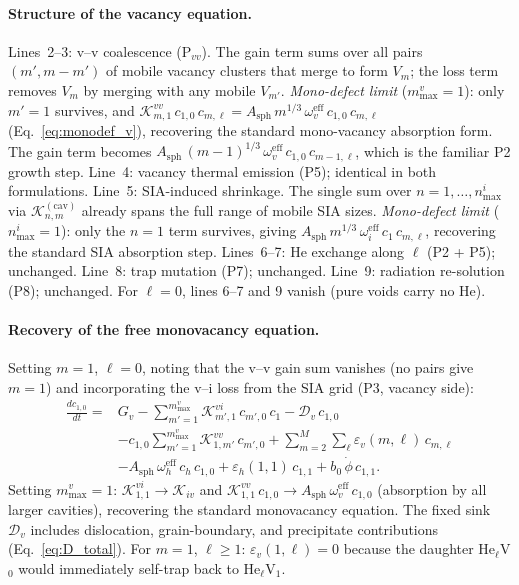\paragraph{Structure of the vacancy equation.}
Lines~2--3: v--v coalescence (P$_{vv}$). The gain term sums over all
pairs $(m', m{-}m')$ of mobile vacancy clusters that merge to form
$V_m$; the loss term removes $V_m$ by merging with any mobile $V_{m'}$.
\emph{Mono-defect limit} ($m_{\max}^v = 1$): only $m'=1$ survives,
and $\mathcal{K}_{m,1}^{vv}\,c_{1,0}\,c_{m,\ell} =
A_{\mathrm{sph}}\,m^{1/3}\,\omega_v^{\mathrm{eff}}\,c_{1,0}\,c_{m,\ell}$
(Eq.~\ref{eq:monodef_v}), recovering the standard mono-vacancy absorption
form. The gain term becomes $A_{\mathrm{sph}}\,(m{-}1)^{1/3}\,
\omega_v^{\mathrm{eff}}\,c_{1,0}\,c_{m-1,\ell}$, which is the
familiar P2 growth step.
Line~4: vacancy thermal emission (P5); identical in both formulations.
Line~5: SIA-induced shrinkage. The single sum over $n = 1,\ldots,n_{\max}^i$
via $\mathcal{K}_{n,m}^{(\mathrm{cav})}$ already spans the full range of
mobile SIA sizes. \emph{Mono-defect limit} ($n_{\max}^i = 1$): only the
$n=1$ term survives, giving $A_{\mathrm{sph}}\,m^{1/3}\,\omega_i^{\mathrm{eff}}
\,c_1\,c_{m,\ell}$, recovering the standard SIA absorption step.
Lines~6--7: He exchange along $\ell$ (P2 + P5); unchanged.
Line~8: trap mutation (P7); unchanged.
Line~9: radiation re-solution (P8); unchanged.
For $\ell = 0$, lines 6--7 and 9 vanish (pure voids carry no He).

\paragraph{Recovery of the free monovacancy equation.}
Setting $m = 1$, $\ell = 0$, noting that the v--v gain sum vanishes
(no pairs give $m=1$) and incorporating the v--i loss from the SIA
grid (P3, vacancy side):
\begin{equation}\label{eq:ME_V1}
\begin{split}
\frac{dc_{1,0}}{dt} = {} &
  G_v
  - \sum_{m'=1}^{m_{\max}^v}\mathcal{K}_{m',1}^{vi}\,c_{m',0}\,c_1
  - \mathcal{D}_v\,c_{1,0}
  \\
  &- c_{1,0}\sum_{m'=1}^{m_{\max}^v}\mathcal{K}_{1,m'}^{vv}\,c_{m',0}
  + \sum_{m=2}^{M}\sum_\ell\varepsilon_v(m,\ell)\,c_{m,\ell}
  \\
  &- A_{\mathrm{sph}}\,\omega_h^{\mathrm{eff}}\,c_h\,c_{1,0}
   + \varepsilon_h(1,1)\,c_{1,1}
   + b_0\,\dot{\phi}\,c_{1,1}.
\end{split}
\end{equation}
Setting $m_{\max}^v = 1$: $\mathcal{K}_{1,1}^{vi} \to \mathcal{K}_{iv}$
and $\mathcal{K}_{1,1}^{vv}\,c_{1,0} \to A_{\mathrm{sph}}\,\omega_v^{\mathrm{eff}}
\,c_{1,0}$ (absorption by all larger cavities), recovering the standard
monovacancy equation. The fixed sink $\mathcal{D}_v$ includes dislocation,
grain-boundary, and precipitate contributions (Eq.~\ref{eq:D_total}). For
$m=1$, $\ell \geq 1$: $\varepsilon_v(1,\ell) = 0$ because the daughter
He$_\ell$V$_0$ would immediately self-trap back to He$_\ell$V$_1$.


